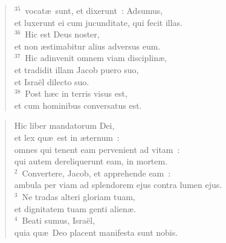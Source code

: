 \begin{flushleft}
\begin{verse}
${}^{35}$~vocat\ae\ sunt, et dixerunt~: Adsumus,\\ et luxerunt ei cum jucunditate, qui fecit illas.\\
${}^{36}$~Hic est Deus noster,\\ et non \ae stimabitur alius adversus eum.\\
${}^{37}$~Hic adinvenit omnem viam disciplin\ae ,\\ et tradidit illam Jacob puero suo,\\ et Isra\"el dilecto suo.\\
${}^{38}$~Post h\ae c in terris visus est,\\ et cum hominibus conversatus est.\end{verse}\end{flushleft}


\begin{flushleft}\begin{verse}\vspace{-19pt}Hic liber mandatorum Dei,\\ et lex qu\ae\ est in \ae ternum~:\\ omnes qui tenent eam pervenient ad vitam~:\\ qui autem dereliquerunt eam, in mortem.\\
${}^{2}$~Convertere, Jacob, et apprehende eam~:\\ ambula per viam ad splendorem ejus contra lumen ejus.\\
${}^{3}$~Ne tradas alteri gloriam tuam,\\ et dignitatem tuam genti alien\ae .\\
${}^{4}$~Beati sumus, Isra\"el,\\ quia qu\ae\ Deo placent manifesta sunt nobis.\end{verse}\end{flushleft}


